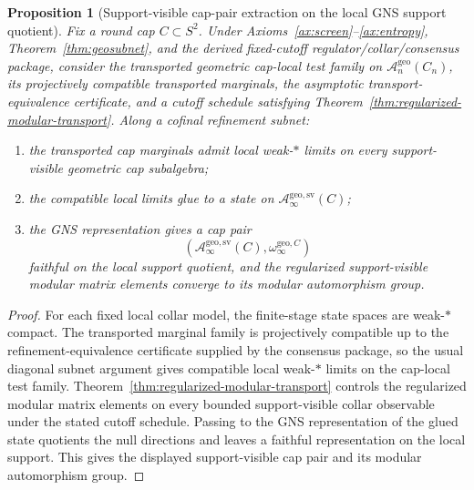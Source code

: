 \documentclass[11pt]{article}
\newtheorem{proposition}[theorem]{Proposition}
\begin{document}
\begin{proposition}[Support-visible cap-pair extraction on the local GNS support quotient]\label{prop:cap-pair-extraction}
Fix a round cap \(C\subset S^2\). Under Axioms~\ref{ax:screen}--\ref{ax:entropy}, Theorem~\ref{thm:geosubnet}, and the derived fixed-cutoff regulator/collar/consensus package, consider the transported geometric cap-local test family on \(\mathcal A_n^{\mathrm{geo}}(C_n)\), its projectively compatible transported marginals, the asymptotic transport-equivalence certificate, and a cutoff schedule satisfying Theorem~\ref{thm:regularized-modular-transport}. Along a cofinal refinement subnet:
\begin{enumerate}[label=\textup{(\roman*)},leftmargin=2em]
\item the transported cap marginals admit local weak-\(*\) limits on every support-visible geometric cap subalgebra;
\item the compatible local limits glue to a state on \(\mathcal A_\infty^{\mathrm{geo,sv}}(C)\);
\item the GNS representation gives a cap pair
\[
(\mathcal A_\infty^{\mathrm{geo,sv}}(C),\omega_\infty^{\mathrm{geo},C})
\]
faithful on the local support quotient, and the regularized support-visible modular matrix elements converge to its modular automorphism group.
\end{enumerate}
\end{proposition}

\begin{proof}
For each fixed local collar model, the finite-stage state spaces are weak-\(*\) compact. The transported marginal family is projectively compatible up to the refinement-equivalence certificate supplied by the consensus package, so the usual diagonal subnet argument gives compatible local weak-\(*\) limits on the cap-local test family. Theorem~\ref{thm:regularized-modular-transport} controls the regularized modular matrix elements on every bounded support-visible collar observable under the stated cutoff schedule. Passing to the GNS representation of the glued state quotients the null directions and leaves a faithful representation on the local support. This gives the displayed support-visible cap pair and its modular automorphism group.
\end{proof}
\end{document}
